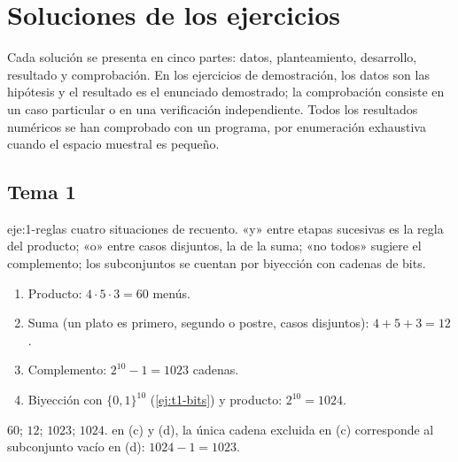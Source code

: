 \chapter{Soluciones de los ejercicios}
\label{ap:soluciones}

Cada solución se presenta en cinco partes: datos, planteamiento, desarrollo, resultado y comprobación. En los ejercicios de demostración, los datos son las hipótesis y el resultado es el enunciado demostrado; la comprobación consiste en un caso particular o en una verificación independiente. Todos los resultados numéricos se han comprobado con un programa, por enumeración exhaustiva cuando el espacio muestral es pequeño.

\section{Tema 1}

\begin{solucion}{eje:1-reglas}
\datos cuatro situaciones de recuento.
\planteamiento «y» entre etapas sucesivas es la regla del producto; «o» entre casos disjuntos, la de la suma; «no todos» sugiere el complemento; los subconjuntos se cuentan por biyección con cadenas de bits.
\pasos
\begin{enumerate}[label=(\alph*)]
  \item Producto: $4\cdot5\cdot3=60$ menús.
  \item Suma (un plato es primero, segundo o postre, casos disjuntos): $4+5+3=12$.
  \item Complemento: $2^{10}-1=1023$ cadenas.
  \item Biyección con $\{0,1\}^{10}$ (\cref{ej:t1-bits}) y producto: $2^{10}=1024$.
\end{enumerate}
\resultado $60$; $12$; $1023$; $1024$.
\comprobacion en (c) y (d), la única cadena excluida en (c) corresponde al subconjunto vacío en (d): $1024-1=1023$.
\end{solucion}

